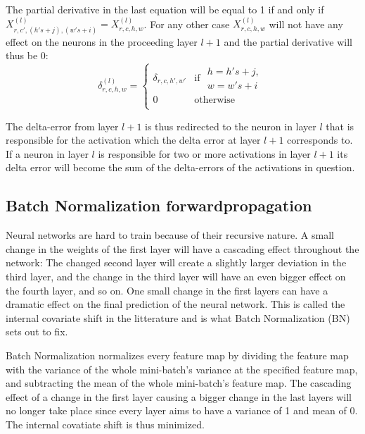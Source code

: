 \documentclass[a4paper, twoside]{article}
\begin{document}
The partial derivative in the last equation will be equal to 1 if and only if $X^{(l)}_{r,c',(h's+j),(w's+i)} = X^{(l)}_{r,c,h,w}$. For any other case $X^{(l)}_{r,c,h,w}$ will not have any effect on the neurons in the proceeding layer $l+1$ and the partial derivative will thus be 0:\cite{cs231n} \cite{convmath} \cite{webconv3}
\begin{equation}
\delta^{(l)}_{r,c,h,w} = \begin{cases}
				\delta_{r,c,h',w'} & \mbox{if } \begin{split} h = h's+j, \\w = w's+i \end{split}\\
				0 & \mbox{otherwise}\\
			\end{cases}
\end{equation}

The delta-error from layer $l+1$ is thus redirected to the neuron in layer $l$ that is responsible for the activation which the delta error at layer $l+1$ corresponds to. If a neuron in layer $l$ is responsible for two or more activations in layer $l+1$ its delta error will become the sum of the delta-errors of the activations in question. \cite{cs231n} \cite{convmath} \cite{webconv3}

\subsection{Batch Normalization forwardpropagation}
Neural networks are hard to train because of their recursive nature. A small change in the weights of the first layer will have a cascading effect throughout the network: The changed second layer will create a slightly larger deviation in the third layer, and the change in the third layer will have an even bigger effect on the fourth layer, and so on. One small change in the first layers can have a dramatic effect on the final prediction of the neural network. This is called  the internal covariate shift in the litterature and is what Batch Normalization (BN) sets out to fix. \cite{cs231n} \cite{batchnorm}

Batch Normalization normalizes every feature map by dividing the feature map with the variance of the whole mini-batch's variance at the specified feature map, and subtracting the mean of the whole mini-batch's feature map. The cascading effect of a change in the first layer causing a bigger change in the last layers will no longer take place since every layer aims to have a variance of 1 and mean of 0. The internal covatiate shift is thus minimized. \cite{cs231n} \cite{batchnorm}
\end{document}
